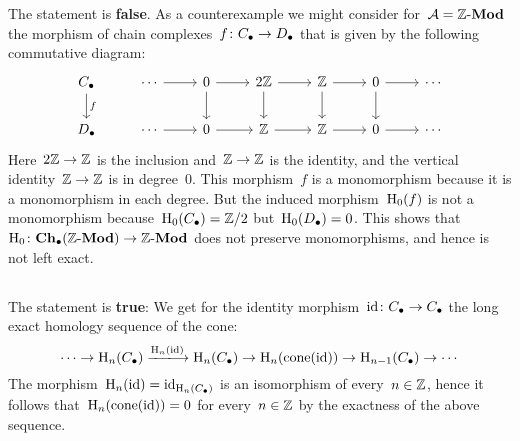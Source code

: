 \section{}





\subsection{}

The statement is \textbf{false}.
As a counterexample we might consider for~$\mathcal{A} = \text{$\mathbb{Z}$-$\mathbf{Mod}$}$ the morphism of chain complexes~$f \colon C_\bullet \to D_\bullet$ that is given by the following commutative diagram:
\[
  \begin{tikzcd}
      \Ccc
      \arrow{d}[right]{f}
    & \dotsb
      \arrow{r}
    & 0
      \arrow{r}
      \arrow{d}
    & 2\Integer
      \arrow{r}
      \arrow{d}
    & \Integer
      \arrow{r}
      \arrow{d}
    & 0
      \arrow{r}
      \arrow{d}
    & \dotsb
    \\
      \Dcc
    & \dotsb
      \arrow{r}
    & 0
      \arrow{r}
    & \Integer
      \arrow{r}
    & \Integer
      \arrow{r}
    & 0
      \arrow{r}
    & \dotsb
  \end{tikzcd}
\]
Here~$2\mathbb{Z} \to \mathbb{Z}$ is the inclusion and~$\mathbb{Z} \to \mathbb{Z}$ is the identity, and the vertical identity~$\mathbb{Z} \to \mathbb{Z}$ is in degree~$0$.
This morphism~$f$ is a monomorphism because it is a monomorphism in each degree.
But the induced morphism~$\operatorname{H}_0(f)$ is not a monomorphism because~$\operatorname{H}_0(C_\bullet) = \mathbb{Z}/2$ but~$\operatorname{H}_0(D_\bullet) = 0$.
This shows that~$\operatorname{H}_0 \colon \mathbf{Ch}_\bullet(\text{$\mathbb{Z}$-$\mathbf{Mod}$}) \to \text{$\mathbb{Z}$-$\mathbf{Mod}$}$ does not preserve monomorphisms, and hence is not left exact.





\subsection{}

The statement is \textbf{true}:
We get for the identity morphism~$\operatorname{id} \colon C_\bullet \to C_\bullet$ the long exact homology sequence of the cone:
\[
  \dotsb
  \to
  \Hl_n(\Ccc)
  \xlongto{\Hl_n(\id)}
  \Hl_n(\Ccc)
  \to
  \Hl_n(\cone(\id))
  \to
  \Hl_{n-1}(\Ccc)
  \to
  \dotsb
\]
The morphism~$\operatorname{H}_n(\operatorname{id}) = \operatorname{id}_{\operatorname{H}_n(C_\bullet)}$ is an isomorphism of every~$n \in \mathbb{Z}$, hence it follows that~$\operatorname{H}_n(\operatorname{cone}(\operatorname{id})) = 0$ for every~$n \in \mathbb{Z}$ by the exactness of the above sequence.





